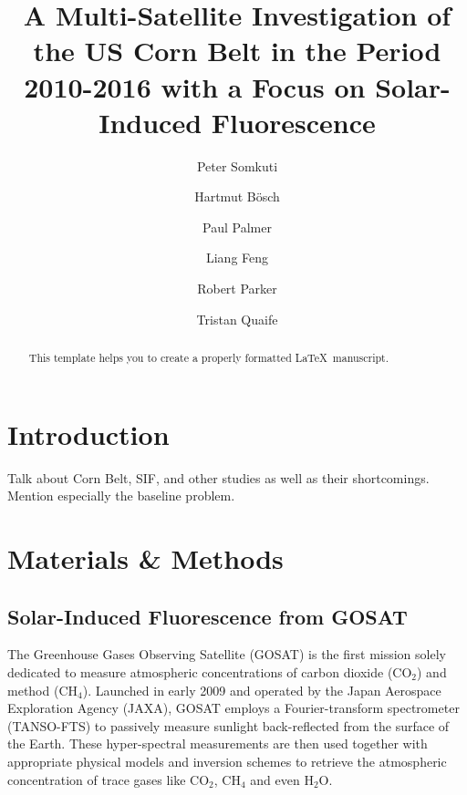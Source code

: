 \documentclass[review, a4paper, 10pt, times]{elsarticle}
\begin{document}
\begin{frontmatter}

\title{A Multi-Satellite Investigation of the US Corn Belt in the Period 2010-2016 with a Focus on Solar-Induced Fluorescence}

\author[uol,nceo]{Peter Somkuti}
\author[uol,nceo]{Hartmut B\"osch}
\author[uoe,nceo]{Paul Palmer}
\author[uoe,nceo]{Liang Feng}
\author[uol,nceo]{Robert Parker}
\author[nceo]{Tristan Quaife}





\address[uol]{University of Leicester, Department of Physics of Astronomy, Leicester, UK}
\address[nceo]{National Centre for Earth Observation, University of Leicester, Leicester, UK}
\address[uoe]{University of Edinburgh, Edinburgh, UK}

\begin{abstract}
This template helps you to create a properly formatted \LaTeX\ manuscript.
\end{abstract}

\end{frontmatter}
\linenumbers

\section{Introduction}

Talk about Corn Belt, SIF, and other studies as well as their shortcomings. Mention especially the baseline problem.

\section{Materials \& Methods}
\subsection{Solar-Induced Fluorescence from GOSAT}
\label{sec:GOSAT_SIF}

The Greenhouse Gases Observing Satellite (GOSAT) is the first mission solely dedicated to measure atmospheric concentrations of carbon dioxide (CO$_2$) and method (CH$_4$). Launched in early 2009 and operated by the Japan Aerospace Exploration Agency (JAXA), GOSAT employs a Fourier-transform spectrometer (TANSO-FTS) to passively measure sunlight back-reflected from the surface of the Earth. These hyper-spectral measurements are then used together with appropriate physical models and inversion schemes to retrieve the atmospheric concentration of trace gases like CO$_2$, CH$_4$ and even H$_2$O.
\end{document}
